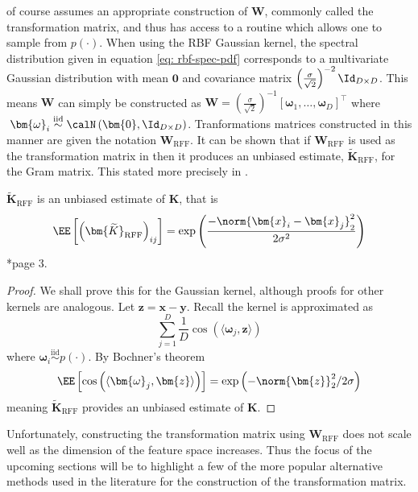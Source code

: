  of course assumes an appropriate construction of $\bm{W}$, commonly called the transformation matrix, and thus has access to a routine which allows one to sample from $p(\cdot)$. When using the RBF Gaussian kernel, the spectral distribution given in equation \ref{eq: rbf-spec-pdf} corresponds to a multivariate Gaussian distribution with mean $\bm{0}$ and covariance matrix $\left( \frac{\sigma}{\sqrt{2}} \right)^{-2} \Id_{D \times D}$. This means $\bm{W}$ can simply be constructed as $\bm{W} = \left( \frac{\sigma}{\sqrt{2}} \right)^{-1} \left[ \bm{\omega}_1 ,\ldots , \bm{\omega}_D \right]^{\intercal}$ where $\; \bm{\omega}_i \stackrel{\text{iid}}{\sim} \calN \left( \bm{0} , \Id_{D \times D} \right)$. Tranformations matrices constructed in this manner are given the notation $\bm{W}_{\text{RFF}}$. It can be shown that if $\bm{W}_{\text{RFF}}$ is used as the transformation matrix in  then it produces an unbiased estimate, $\bm{\widetilde{K}}_{\text{RFF}}$, for the Gram matrix. This stated more precisely in .

\begin{lem} \label{lem: rff-unbiased}
    $\bm{\widetilde{K}}_{\text{RFF}}$ is an unbiased estimate of $\bm{K}$, that is
    \[
        \EE \left[ \left( \bm{\widetilde{K}}_{\text{RFF}} \right)_{ij} \right] = \exp \left( \frac{- \norm{\bm{x}_i - {\bm{x}_j}}_{2}^{2}}{2 \sigma^2} \right)
    \] \cite{YuFelixX2016ORF}*{page 3}.
\end{lem}

\begin{proof}
    We shall prove this for the Gaussian kernel, although proofs for other kernels are analogous. Let $\bm{z} = \bm{x} - \bm{y}$. Recall the kernel is approximated as
    \[
        \sum_{j=1}^{D} \frac{1}{D} \cos \left( \langle \bm{\omega}_j , \bm{z} \rangle \right)
    \]
    where $\bm{\omega}_i \stackrel{\text{iid}}{\sim} p(\cdot)$. By Bochner's theorem
    \[
        \EE \left[ \cos \left( \langle \bm{\omega}_j , \bm{z} \rangle \right) \right] = \exp \left( - \norm{\bm{z}}^2_2 / 2 \sigma \right)
    \]
    meaning $\bm{\widetilde{K}}_{\text{RFF}}$ provides an unbiased estimate of $\bm{K}$.
\end{proof}

Unfortunately, constructing the transformation matrix using $\bm{W}_{\text{RFF}}$ does not scale well as the dimension of the feature space increases. Thus the focus of the upcoming sections will be to highlight a few of the more popular alternative methods used in the literature for the construction of the transformation matrix.